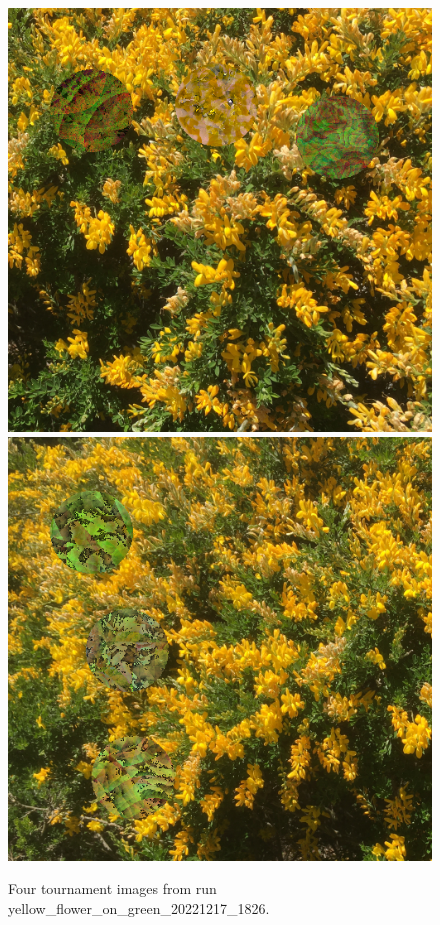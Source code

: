 \documentclass[acmtog]{acmart}
\begin{document}
\begin{figure}
    \hfill
    \includegraphics[scale=0.24]{20221218_step_5947.png}
    \hfill
    \includegraphics[scale=0.24]{20221218_step_6753.png}
    \caption{Four tournament images from run yellow\_flower\_on\_green\_20221217\_1826.}
    \label{fig:yellow_flower_4x}
\end{figure}
\end{document}

